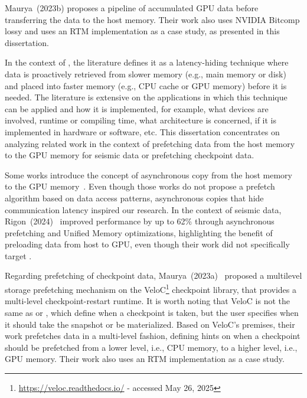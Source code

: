 \documentclass[Ingles]{ic-tese-v3}
\begin{document}
Maurya~\etal(2023b)\cite{maurya2023compress} proposes a pipeline of accumulated GPU data \compression before transferring the data to the host memory. Their work also uses NVIDIA Bitcomp lossy \compression and uses an RTM implementation as a case study, as presented in this dissertation.

In the context of , the literature defines it as a latency-hiding technique where data is proactively retrieved from slower memory (e.g., main memory or disk) and placed into faster memory (e.g., CPU cache or GPU memory) before it is needed\cite{mittal2017,vanderwiel2000}. The literature is extensive on the applications in which this technique can be applied and how it is implemented, for example, what devices are involved, runtime or compiling time, what architecture is concerned, if it is implemented in hardware or software, etc. This dissertation concentrates on analyzing related work in the context of prefetching data from the host memory to the GPU memory for seismic data or prefetching checkpoint data.

Some works introduce the concept of asynchronous copy from the host memory to the GPU memory~\cite{jeong2022,jung2020}. Even though those works do not propose a prefetch algorithm based on data access patterns, asynchronous copies that hide communication latency inspired our research. In the context of seismic data, Rigon~\etal(2024)~\cite{rigon2024} improved performance by up to 62\% through asynchronous prefetching and Unified Memory optimizations, highlighting the benefit of preloading data from host to GPU, even though their work did not specifically target \checkpointing.

Regarding prefetching of checkpoint data, Maurya~\etal (2023a)~\cite{maurya2023} proposed a multilevel storage prefetching mechanism on the VeloC\footnote{\url{https://veloc.readthedocs.io/} - accessed May 26, 2025} checkpoint library, that provides a multi-level checkpoint-restart runtime. It is worth noting that VeloC is not the same as \revolve or \zcut, which define when a checkpoint is taken, but the user specifies when it should take the snapshot or be materialized. Based on VeloC's premises, their work prefetches data in a multi-level fashion, defining hints on when a checkpoint should be prefetched from a lower level, i.e., CPU memory, to a higher level, i.e., GPU memory. Their work also uses an RTM implementation as a case study. 


\end{document}
